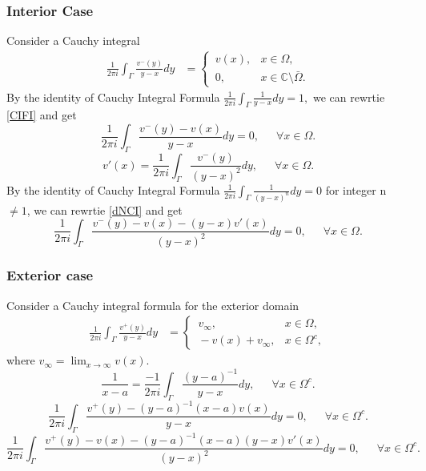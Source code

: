 \documentclass[preprint, 10pt]{elsarticle}
\newcommand{\Cdb}{\mbox{$\mathbb{C}$}}
\begin{document}
\subsubsection{Interior Case}
Consider a Cauchy integral 
\begin{align}\label{CIFI}
\frac{1}{2\pi i}\int_{\Gamma}\frac{v^-({ y})}{{ y}-{ x}} d{ y}
&=\begin{cases}
\,v(x), &{ x} \in \Omega,\\ 
\,0,  &{ x} \in \Cdb\setminus \bar{\Omega}.
\end{cases}
\end{align}
By the identity of Cauchy Integral Formula $\displaystyle\frac{1}{2 \pi i}\int_{\Gamma}\frac{1}{{ y}-{ x}} d{ y}=1,$ we can rewrtie \eqref{CIFI} and get 
\begin{equation}
\frac{1}{2\pi i}\int_{\Gamma}\frac{v^-({ y})-v(x)}{{ y}-{ x}} d{ y}=0,\,\,\,\,\,\,\,\,\, \forall { x} \in \Omega.
\end{equation}
\begin{equation}\label{dNCI}
v'({x})=\frac{1}{2\pi i}\int_{\Gamma}\frac{v^-({ y})}{(y- x)^2} d{ y},\,\,\,\,\,\,\,\,\, \forall { x} \in \Omega.
\end{equation}
By the identity of Cauchy Integral Formula $\displaystyle\frac{1}{2 \pi i}\int_{\Gamma}\frac{1}{( y- x)^n} d{ y}=0$ for integer n $\neq 1$, we can rewrtie \eqref{dNCI} and get 
\begin{equation}
\frac{1}{2\pi i}\int_{\Gamma}\frac{v^-({ y})-v(x)-(y-x)v'(x)}{(y-x)^2} d{ y}=0,\,\,\,\,\,\,\,\,\, \forall { x} \in \Omega.
\end{equation}

\subsubsection{Exterior case}
Consider a Cauchy integral formula for the exterior domain
\begin{align}\label{CIFE}
\frac{1}{2\pi i}\int_{\Gamma}\frac{v^+({ y})}{{ y}-{ x}} d{ y}
&=\begin{cases}
\,v_{\infty}, &{ x} \in \Omega,\\ 
\,-v(x)+v_{\infty},  &{ x} \in \Omega^c,
\end{cases}
\end{align}
where $v_{\infty}=\displaystyle\lim_{x \to \infty}v(x)$.
\begin{equation}
\frac{1}{x-a}=\frac{-1}{2 \pi i} \int_{\Gamma}\frac{(y-a)^{-1}}{y-x} d{ y},\,\,\,\,\,\,\,\,\, \forall { x} \in \Omega^c.
\end{equation}
\begin{equation}
\frac{1}{2\pi i}\int_{\Gamma}\frac{v^+({ y})-(y-a)^{-1}(x-a)v(x)}{y-x} d{ y}=0,\,\,\,\,\,\,\,\,\, \forall { x} \in \Omega^c.
\end{equation}
\begin{equation}
\frac{1}{2\pi i}\int_{\Gamma}\frac{v^+({ y})-v(x)-(y-a)^{-1}(x-a)(y-x)v'(x)}{(y-x)^2} d{ y}=0,\,\,\,\,\,\,\,\,\, \forall { x} \in \Omega^c.
\end{equation}
\end{document}
